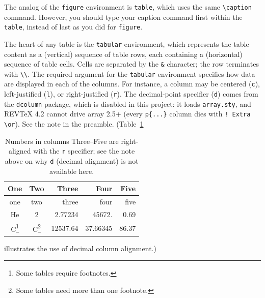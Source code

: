 \documentclass[%
 aip,
 amsmath,amssymb,
 reprint,%
]{revtex4-2}
\begin{document}
The analog of the \texttt{figure} environment is \texttt{table}, which uses
the same \verb+\caption+ command.
However, you should type your caption command first within the \texttt{table}, 
instead of last as you did for \texttt{figure}.

The heart of any table is the \texttt{tabular} environment,
which represents the table content as a (vertical) sequence of table rows,
each containing a (horizontal) sequence of table cells. 
Cells are separated by the \verb+&+ character;
the row terminates with \verb+\\+. 
The required argument for the \texttt{tabular} environment
specifies how data are displayed in each of the columns. 
For instance, a column
may be centered (\verb+c+), left-justified (\verb+l+), or right-justified (\verb+r+).
The decimal-point specifier (\verb+d+) comes from the \texttt{dcolumn} package,
which is disabled in this project: it loads \texttt{array.sty}, and REVTeX 4.2
cannot drive array 2.5+ (every \verb+p{...}+ column dies with
\verb+! Extra \or+). See the note in the preamble.
(Table~\ref{tab:table4}%
\begin{table}
\caption{\label{tab:table4}Numbers in columns Three--Five are right-aligned
with the \texttt{r} specifier; see the note above on why \texttt{d} (decimal
alignment) is not available here. }
\begin{ruledtabular}
\begin{tabular}{ccrrr}
One&Two&\mbox{Three}&\mbox{Four}&\mbox{Five}\\
\hline
one&two&\mbox{three}&\mbox{four}&\mbox{five}\\
He&2& 2.77234 & 45672. & 0.69 \\
C\footnote{Some tables require footnotes.}
  &C\footnote{Some tables need more than one footnote.}
  & 12537.64 & 37.66345 & 86.37 \\
\end{tabular}
\end{ruledtabular}
\end{table}
illustrates the use of decimal column alignment.)
\end{document}
